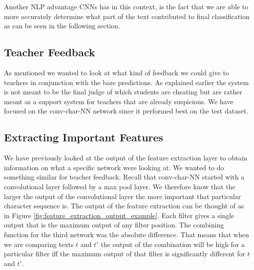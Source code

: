 Another \gls{NLP} advantage \glspl{CNN} has in this context, is the fact that we
are able to more accurately determine what part of the text contributed to final
classification as can be seen in the following section.


\subsection{Teacher Feedback}

As mentioned we wanted to look at what kind of feedback we could give to
teachers in conjunction with the bare predictions. As explained earlier the
system is not meant to be the final judge of which students are cheating but are
rather meant as a support system for teachers that are already suspicious. We
have focused on the \gls{conv-char-NN} network since it performed best on the
test dataset.

\subsection{Extracting Important Features}

We have previously looked at the output of the feature extraction layer to
obtain information on what a specific network were looking at. We wanted to do
something similar for teacher feedback. Recall that \gls{conv-char-NN} started
with a convolutional layer followed by a max pool layer. We therefore know
that the larger the output of the convolutional layer the more important that
particular character sequence is. The output of the feature extraction can be
thought of as in Figure \ref{fig:feature_extraction_output_example}. Each filter
gives a single output that is the maximum output of any filter position. The
combining function for the third network was the absolute difference. That means
that when we are comparing texts $t$ and $t'$ the output of the combination
will be high for a particular filter iff the maximum output of that filter is
significantly different for $t$ and $t'$.

